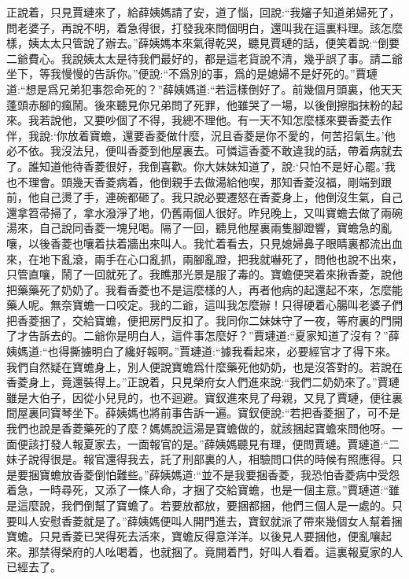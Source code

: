 \begin{parag}
    正說着，只見賈璉來了，給薛姨媽請了安，道了惱，回說:“我嬸子知道弟婦死了，問老婆子，再說不明，着急得很，打發我來問個明白，還叫我在這裏料理。該怎麼樣，姨太太只管說了辦去。”薛姨媽本來氣得乾哭，聽見賈璉的話，便笑着說:“倒要二爺費心。我說姨太太是待我們最好的，都是這老貨說不清，幾乎誤了事。請二爺坐下，等我慢慢的告訴你。”便說:“不爲別的事，爲的是媳婦不是好死的。”賈璉道:“想是爲兄弟犯事怨命死的？”薛姨媽道:“若這樣倒好了。前幾個月頭裏，他天天蓬頭赤腳的瘋鬧。後來聽見你兄弟問了死罪，他雖哭了一場，以後倒擦脂抹粉的起來。我若說他，又要吵個了不得，我總不理他。有一天不知怎麼樣來要香菱去作伴，我說:‘你放着寶蟾，還要香菱做什麼，況且香菱是你不愛的，何苦招氣生。’他必不依。我沒法兒，便叫香菱到他屋裏去。可憐這香菱不敢違我的話，帶着病就去了。誰知道他待香菱很好，我倒喜歡。你大妹妹知道了，說:‘只怕不是好心罷。’我也不理會。頭幾天香菱病着，他倒親手去做湯給他喫，那知香菱沒福，剛端到跟前，他自己燙了手，連碗都砸了。我只說必要遷怒在香菱身上，他倒沒生氣，自己還拿笤帚掃了，拿水潑淨了地，仍舊兩個人很好。昨兒晚上，又叫寶蟾去做了兩碗湯來，自己說同香菱一塊兒喝。隔了一回，聽見他屋裏兩隻腳蹬響，寶蟾急的亂嚷，以後香菱也嚷着扶着牆出來叫人。我忙着看去，只見媳婦鼻子眼睛裏都流出血來，在地下亂滾，兩手在心口亂抓，兩腳亂蹬，把我就嚇死了，問他也說不出來，只管直嚷，鬧了一回就死了。我瞧那光景是服了毒的。寶蟾便哭着來揪香菱，說他把藥藥死了奶奶了。我看香菱也不是這麼樣的人，再者他病的起還起不來，怎麼能藥人呢。無奈寶蟾一口咬定。我的二爺，這叫我怎麼辦！只得硬着心腸叫老婆子們把香菱捆了，交給寶蟾，便把房門反扣了。我同你二妹妹守了一夜，等府裏的門開了才告訴去的。二爺你是明白人，這件事怎麼好？”賈璉道:“夏家知道了沒有？”薛姨媽道:“也得撕擄明白了纔好報啊。”賈璉道:“據我看起來，必要經官才了得下來。我們自然疑在寶蟾身上，別人便說寶蟾爲什麼藥死他奶奶，也是沒答對的。若說在香菱身上，竟還裝得上。”正說着，只見榮府女人們進來說:“我們二奶奶來了。”賈璉雖是大伯子，因從小兒見的，也不迴避。寶釵進來見了母親，又見了賈璉，便往裏間屋裏同寶琴坐下。薛姨媽也將前事告訴一遍。寶釵便說:“若把香菱捆了，可不是我們也說是香菱藥死的了麼？媽媽說這湯是寶蟾做的，就該捆起寶蟾來問他呀。一面便該打發人報夏家去，一面報官的是。”薛姨媽聽見有理，便問賈璉。賈璉道:“二妹子說得很是。報官還得我去，託了刑部裏的人，相驗問口供的時候有照應得。只是要捆寶蟾放香菱倒怕難些。”薛姨媽道:“並不是我要捆香菱，我恐怕香菱病中受怨着急，一時尋死，又添了一條人命，才捆了交給寶蟾，也是一個主意。”賈璉道:“雖是這麼說，我們倒幫了寶蟾了。若要放都放，要捆都捆，他們三個人是一處的。只要叫人安慰香菱就是了。”薛姨媽便叫人開門進去，寶釵就派了帶來幾個女人幫着捆寶蟾。只見香菱已哭得死去活來，寶蟾反得意洋洋。以後見人要捆他，便亂嚷起來。那禁得榮府的人吆喝着，也就捆了。竟開着門，好叫人看着。這裏報夏家的人已經去了。
\end{parag}


